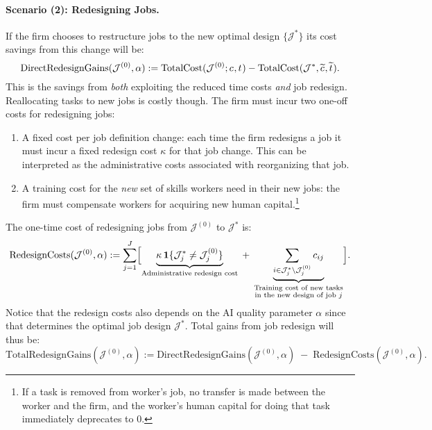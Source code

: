 \documentclass{article}
\theoremstyle{plain}
\theoremstyle{plain}
\begin{document}
\paragraph{Scenario (2): Redesigning Jobs.}
If the firm chooses to restructure jobs to the new optimal design \(\{\mathcal{J}^*\}\) its cost savings from this change will be:
\begin{equation}
\label{eq:job_redesign_direct_savings}
\text{DirectRedesignGains}(\mathcal{J}^{(0)}, \alpha)
:=
\text{TotalCost}(\mathcal{J}^{(0)}; c_{}, t_{}) - \text{TotalCost}(\mathcal{J}^{*}, \widetilde{c_{}}, \widetilde{t_{}}).
\end{equation}
This is the savings from \emph{both} exploiting the reduced time costs \emph{and} job redesign.
Reallocating tasks to new jobs is costly though.
The firm must incur two one-off costs for redesigning jobs:
\begin{enumerate}
\item A fixed cost per job definition change: each time the firm redesigns a job it must incur a fixed redesign cost $\kappa$ for that job change.
This can be interpreted as the administrative costs associated with reorganizing that job.
\item A training cost for the \emph{new} set of skills workers need in their new jobs: the firm must compensate workers for acquiring new human capital.\footnote{If a task is removed from worker's job, no transfer is made between the worker and the firm, and the worker's human capital for doing that task immediately deprecates to 0.}
\end{enumerate}
The one-time cost of redesigning jobs from $\mathcal{J}^{(0)}$ to $\mathcal{J}^{*}$ is:
\begin{equation}
\label{eq:job_redesign_cost}
\text{RedesignCosts}(\mathcal{J}^{(0)}, \alpha)
:=
\sum_{j=1}^{J}
\Bigl[
\underbrace{\kappa\,\mathbf1\{\mathcal{J}_j^*\neq\mathcal{J}_j^{(0)}\}}_{\text{Administrative redesign cost}}
\;+\;
\underbrace{\sum_{i\in\mathcal{J}_j^*\setminus\mathcal{J}_j^{(0)}}c_{ij}}_{\substack{
\text{Training cost of new tasks}\\ 
\text{in the new design of job $j$}}
}
\Bigr].
\end{equation}
Notice that the redesign costs also depends on the AI quality parameter $\alpha$ since that determines the optimal job design $\mathcal{J}^{*}$.
Total gains from job redesign will thus be:
\begin{equation}
\label{eq:job_redesign_gain}
\text{TotalRedesignGains}(\mathcal{J}^{(0)}, \alpha)
:=
\text{DirectRedesignGains}(\mathcal{J}^{(0)}, \alpha)
\;-\;
\text{RedesignCosts}(\mathcal{J}^{(0)}, \alpha).
\end{equation}
\end{document}
